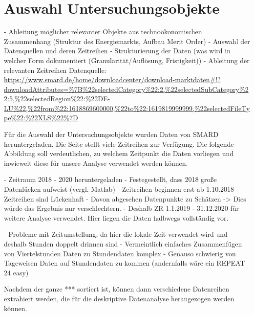 \section{Auswahl Untersuchungsobjekte}
-	Ableitung möglicher relevanter Objekte aus technoökonomischen Zusammenhang (Struktur des Energiemarkts, Aufbau Merit Order)
-	Auswahl der Datenquellen und deren Zeitreihen
-	Strukturierung der Daten (was wird in welcher Form dokumentiert (Granularität/Auflösung, Fristigkeit))
-	Ableitung der relevanten Zeitreihen
Datenquelle: \url{https://www.smard.de/home/downloadcenter/download-marktdaten#!?downloadAttributes=%7B%22selectedCategory%22:2,%22selectedSubCategory%22:5,%22selectedRegion%22:%22DE-LU%22,%22from%22:1618869600000,%22to%22:1619819999999,%22selectedFileType%22:%22XLS%22%7D}


Für die Auswahl der Untersuchungsobjekte wurden Daten von SMARD heruntergeladen. Die Seite stellt viele Zeitreihen zur Verfügung.
Die folgende Abbildung soll verdeutlichen, zu welchem Zeitpunkt die Daten vorliegen und inwieweit diese für unsere Analyse verwendet werden können.


- Zeitraum 2018 - 2020 heruntergeladen
- Festegestellt, dass 2018 große Datenlücken aufweist (vergl. Matlab)
  - Zeitreihen beginnen erst ab 1.10.2018
  - Zeitreihen sind Lückenhaft
- Davon abgesehen Datenpunkte zu Schätzen -> Dies würde das Ergebnis nur verschlechtern.
- Deshalb ZR 1.1.2019 - 31.12.2020 für weitere Analyse verwendet. Hier liegen die Daten halbwegs vollständig vor.

- Probleme mit Zeitumstellung, da hier die lokale Zeit verwendet wird und deshalb Stunden doppelt drinnen sind
  - Vermeintlich einfaches Zusammenfügen von Viertelstunden Daten zu Stundendaten komplex
  - Genauso schwierig von Tageweisen Daten auf Stundendaten zu kommen (andernfalls wäre ein REPEAT 24 easy)

Nachdem der ganze *** sortiert ist, können dann verschiedene Datenreihen extrahiert werden, die für die deskriptive Datenanalyse herangezogen werden können. 
